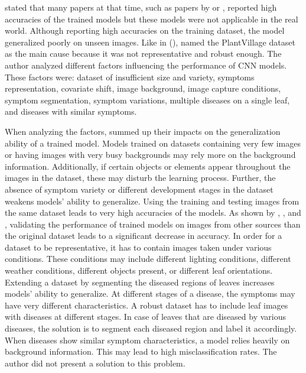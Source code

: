 \documentclass{BachelorBUI}
\begin{document}
        \textcite{Barbedo:2018:2} stated that many papers at that time, such as papers by \textcite{Mohanty:2016} or \textcite{Ferentinos:2018}, reported high accuracies of the trained models but these models were not applicable in the real world. Although reporting high accuracies on the training dataset, the model generalized poorly on unseen images. Like in (\cite{Barbedo:2018:1}), \textcite{Barbedo:2018:2} named the PlantVillage dataset as the main cause because it was not representative and robust enough. The author analyzed different factors influencing the performance of CNN models. These factors were: dataset of insufficient size and variety, symptoms representation, covariate shift, image background, image capture conditions, symptom segmentation, symptom variations, multiple diseases on a single leaf, and diseases with similar symptoms.
        
        When analyzing the factors, \textcite{Barbedo:2018:2} summed up their impacts on the generalization ability of a trained model. Models trained on datasets containing very few images or having images with very busy backgrounds may rely more on the background information. Additionally, if certain objects or elements appear throughout the images in the dataset, these may disturb the learning process. Further, the absence of symptom variety or different development stages in the dataset weakens models' ability to generalize. Using the training and testing images from the same dataset leads to very high accuracies of the models. As shown by \textcite{Sladojevic:2016}, \textcite{Mohanty:2016}, and \textcite{Ferentinos:2018}, validating the performance of trained models on images from other sources than the original dataset leads to a significant decrease in accuracy. In order for a dataset to be representative, it has to contain images taken under various conditions. These conditions may include different lighting conditions, different weather conditions, different objects present, or different leaf orientations. Extending a dataset by segmenting the diseased regions of leaves increases models' ability to generalize. At different stages of a disease, the symptoms may have very different characteristics. A robust dataset has to include leaf images with diseases at different stages. In case of leaves that are diseased by various diseases, the solution is to segment each diseased region and label it accordingly. When diseases show similar symptom characteristics, a model relies heavily on background information. This may lead to high misclassification rates. The author did not present a solution to this problem. 
\end{document}

